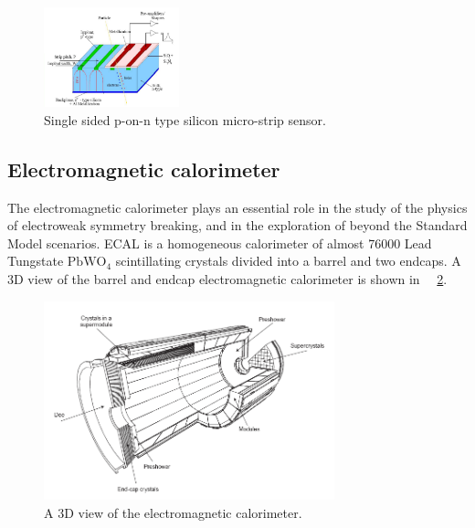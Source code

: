 \begin{figure}[htbp]
\centering
\includegraphics[width=0.35\textwidth]{Images/Silicon_structure}
\caption{Single sided p-on-n type silicon micro-strip sensor.}
\label{Silicon_structure}
\end{figure}


\subsection{Electromagnetic calorimeter}
The electromagnetic calorimeter plays an essential role in the study of the physics of electroweak symmetry breaking, and  in the exploration of  beyond the Standard Model scenarios.  ECAL is a homogeneous calorimeter of almost 76000 Lead Tungstate $\mathrm{PbWO_4}$ scintillating crystals divided into a barrel and two endcaps.
A $3$D view of the barrel and endcap electromagnetic calorimeter is shown in \figurename~~\ref{ECAL_3D}.
\begin{figure}[h!]
 \centering
 \includegraphics[width=0.75\textwidth]{Images/ECAL_3D}
 \caption{A $3$D view of the electromagnetic calorimeter.}
\label{ECAL_3D}
\end{figure}



